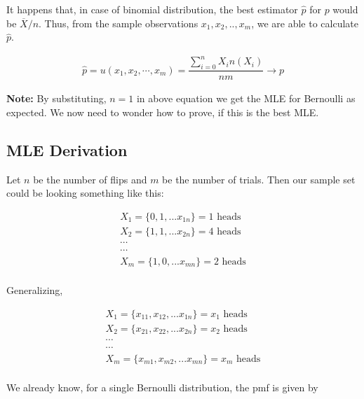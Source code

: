\documentclass[float=false,crop=false]{standalone}
\begin{document}
It happens that, in case of binomial distribution, the best estimator
\(\hat{p}\) for \(p\) would be \(\overline{X}/n\). Thus, from the sample
observations \(x_1, x_2,.. ,x_m\), we are able to calculate \(\hat{p}\).
\begin{tcolorbox}[colback=green!5,colframe=green!40!black,title=Binomial Distribution; $n$ flips; $m$ trials]
\begin{equation}
    \begin{aligned}
        \hat{p} = u(x_1,x_2,\cdots,x_m) = \dfrac{\sum\limits_{i=0}^{n}X_in(X_i)}{nm} \to p \label{eq:M004}
    \end{aligned}
\end{equation}
\end{tcolorbox}
    \textbf{Note:} By substituting, \(n=1\) in above equation we get the MLE
for Bernoulli as expected. We now need to wonder how to prove, if this
is the best MLE.

    \subsection{MLE Derivation}\label{mle-derivation}

    Let \(n\) be the number of flips and \(m\) be the number of trials. Then
our sample set could be looking something like this:

\[
\begin{aligned}
X_1 = \{0,1,...x_{1n}\} = 1 \text{ heads} \\
X_2 = \{1,1,...x_{2n}\} = 4 \text{ heads} \\
\cdots \\
\cdots \\
X_m = \{1,0,...x_{mn}\} = 2 \text{ heads} \\
\end{aligned}
\]

Generalizing,

\[
\begin{aligned}
X_1 = \{x_{11},x_{12},...x_{1n}\} = x_1 \text{ heads}\\
X_2 = \{x_{21},x_{22},...x_{2n}\} = x_2 \text{ heads}\\
\cdots \\
\cdots \\
X_m = \{x_{m1},x_{m2},...x_{mn}\} = x_m \text{ heads} \\
\end{aligned}
\]

We already know, for a single Bernoulli distribution, the pmf is given
by
\end{document}
